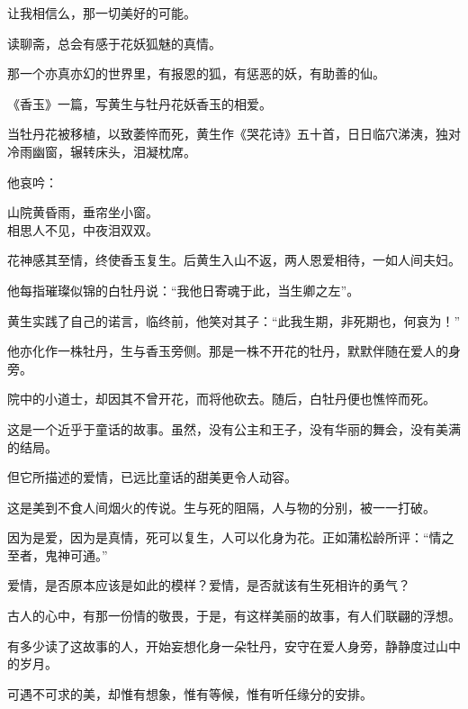 
		让我相信么，那一切美好的可能。

		\vspace{1em}
		读聊斋，总会有感于花妖狐魅的真情。\par
		那一个亦真亦幻的世界里，有报恩的狐，有惩恶的妖，有助善的仙。

		《香玉》一篇，写黄生与牡丹花妖香玉的相爱。\par
		当牡丹花被移植，以致萎悴而死，黄生作《哭花诗》五十首，日日临穴涕洟，独对冷雨幽窗，辗转床头，泪凝枕席。\par
		他哀吟：

		\shortpoem{}{}{}
			山院黄昏雨，垂帘坐小窗。\\
			相思人不见，中夜泪双双。\\
		\endshortpoem

		花神感其至情，终使香玉复生。后黄生入山不返，两人恩爱相待，一如人间夫妇。\par
		他每指璀璨似锦的白牡丹说：“我他日寄魂于此，当生卿之左”。\par
		黄生实践了自己的诺言，临终前，他笑对其子：“此我生期，非死期也，何哀为！”\par
		他亦化作一株牡丹，生与香玉旁侧。那是一株不开花的牡丹，默默伴随在爱人的身旁。\par
		院中的小道士，却因其不曾开花，而将他砍去。随后，白牡丹便也憔悴而死。

		\vspace{1em}
		这是一个近乎于童话的故事。虽然，没有公主和王子，没有华丽的舞会，没有美满的结局。\par
		但它所描述的爱情，已远比童话的甜美更令人动容。\par
		这是美到不食人间烟火的传说。生与死的阻隔，人与物的分别，被一一打破。\par
		因为是爱，因为是真情，死可以复生，人可以化身为花。正如蒲松龄所评：“情之至者，鬼神可通。”

		\vspace{1em}
		爱情，是否原本应该是如此的模样？爱情，是否就该有生死相许的勇气？\par
		古人的心中，有那一份情的敬畏，于是，有这样美丽的故事，有人们联翩的浮想。\par
		有多少读了这故事的人，开始妄想化身一朵牡丹，安守在爱人身旁，静静度过山中的岁月。\par
		可遇不可求的美，却惟有想象，惟有等候，惟有听任缘分的安排。

